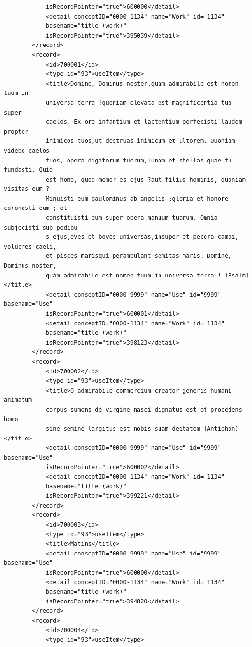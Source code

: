 \documentclass[a4paper,12pt,twoside]{book}
\begin{document}
\begin{verbatim}
            isRecordPointer="true">600000</detail>
            <detail conceptID="0000-1134" name="Work" id="1134"
            basename="title (work)"
            isRecordPointer="true">395039</detail>
        </record>
        <record>
            <id>700001</id>
            <type id="93">useItem</type>
            <title>Domine, Dominus noster,quam admirabile est nomen tuum in 
            universa terra !quoniam elevata est magnificentia tua super 
            caelos. Ex ore infantium et lactentium perfecisti laudem propter
            inimicos tuos,ut destruas inimicum et ultorem. Quoniam videbo caelos
            tuos, opera digitorum tuorum,lunam et stellas quae tu fundasti. Quid 
            est homo, quod memor es ejus ?aut filius hominis, quoniam visitas eum ?
            Minuisti eum paulominus ab angelis ;gloria et honore coronasti eum ; et 
            constituisti eum super opera manuum tuarum. Omnia subjecisti sub pedibu
            s ejus,oves et boves universas,insuper et pecora campi, volucres caeli, 
            et pisces marisqui perambulant semitas maris. Domine, Dominus noster,
            quam admirabile est nomen tuum in universa terra ! (Psalm)</title>
            <detail conseptID="0000-9999" name="Use" id="9999" basename="Use" 
            isRecordPointer="true">600001</detail>
            <detail conceptID="0000-1134" name="Work" id="1134"
            basename="title (work)"
            isRecordPointer="true">398123</detail>
        </record>
        <record>
            <id>700002</id>
            <type id="93">useItem</type>
            <title>O admirabile commercium creator generis humani animatum 
            corpus sumens de virgine nasci dignatus est et procedens homo 
            sine semine largitus est nobis suam deitatem (Antiphon)</title>
            <detail conseptID="0000-9999" name="Use" id="9999" basename="Use" 
            isRecordPointer="true">600002</detail>
            <detail conceptID="0000-1134" name="Work" id="1134"
            basename="title (work)"
            isRecordPointer="true">399221</detail>
        </record>
        <record>
            <id>700003</id>
            <type id="93">useItem</type>
            <title>Matins</title>
            <detail conseptID="0000-9999" name="Use" id="9999" basename="Use"
            isRecordPointer="true">600000</detail>
            <detail conceptID="0000-1134" name="Work" id="1134"
            basename="title (work)" 
            isRecordPointer="true">394820</detail>
        </record>
        <record>
            <id>700004</id>
            <type id="93">useItem</type>

\end{verbatim}
\end{document}
